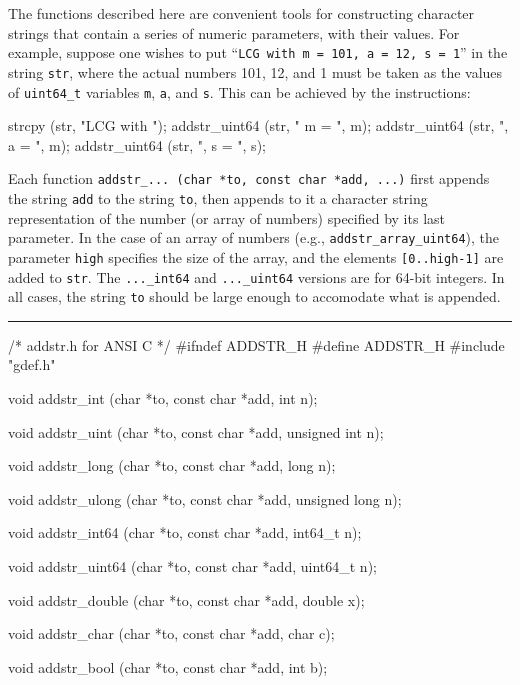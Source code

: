 
The functions described here are convenient tools for constructing
character strings that contain a series of numeric parameters, with their values.
For example, suppose one wishes to put 
``{\tt LCG with m = 101, a = 12, s = 1}'' in the string {\tt str}, 
where the actual 
numbers 101, 12, and 1 must be taken as the values of {\tt uint64\_t}
variables {\tt m}, {\tt a}, and {\tt s}.  
This can be achieved by the instructions:
\vcode

   strcpy (str, "LCG with ");
   addstr\_uint64 (str, " m = ", m);
   addstr\_uint64 (str, ", a = ", m);
   addstr\_uint64 (str, ", s = ", s);
\endvcode

Each function {\tt addstr\_... (char *to, const char *add, ...)}
first appends the string {\tt add} to the string {\tt to}, then
appends to it a character string representation of the number 
(or array of numbers) specified by its last parameter.
In the case of an array of numbers (e.g., {\tt addstr\_array\_uint64}),
the parameter {\tt high} specifies the size of the array, and the
elements {\tt [0..high-1]} are added to {\tt str}.
The {\tt ...\_int64} and {\tt ...\_uint64} versions are for 64-bit integers.
In all cases, the string {\tt to} should be large enough to accomodate
what is appended.


\bigskip\hrule
\code\hide
/*  addstr.h  for ANSI C  */
#ifndef ADDSTR_H
#define ADDSTR_H
\endhide
#include "gdef.h"
\endcode

\code

void  addstr_int (char *to, const char *add, int n);

void  addstr_uint (char *to, const char *add, unsigned int n);

void  addstr_long (char *to, const char *add, long n);

void  addstr_ulong (char *to, const char *add, unsigned long n);

void  addstr_int64 (char *to, const char *add, int64_t n);

void  addstr_uint64 (char *to, const char *add, uint64_t n);

void  addstr_double (char *to, const char *add, double x);

void  addstr_char (char *to, const char *add, char c);

void  addstr_bool (char *to, const char *add, int b);
\endcode

\code

